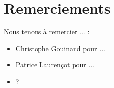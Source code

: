 \section*{Remerciements}

Nous tenons à remercier ... :

\begin{itemize}
	\item Christophe Gouinaud pour ...
	\item Patrice Laurençot pour ...
	\item ?
\end{itemize}

\pagebreak
